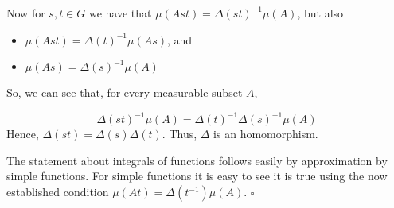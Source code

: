 \documentclass[12pt]{article}
\begin{document}
Now for $s, t \in G$ we have that $\mu(Ast)=\Delta(st)^{-1}\mu(A)$, but also
\begin{itemize}
\item $\mu(Ast)= \Delta(t)^{-1}\mu(As)$, and
\item $\mu(As) = \Delta(s)^{-1}\mu(A)$
\end{itemize}
So, we can see that, for every measurable subset $A$,

\begin{displaymath}
\Delta(st)^{-1}\mu(A) = \Delta(t)^{-1}\Delta(s)^{-1}\mu(A)
\end{displaymath}
Hence, $\Delta(st) = \Delta(s)\Delta(t)$. Thus, $\Delta$ is an homomorphism.

The statement about integrals of functions follows easily by approximation by simple functions. For simple functions it is easy to see it is true using the now established condition $\mu(At) = \Delta(t^{-1})\mu(A)$. $\square$
\end{document}
